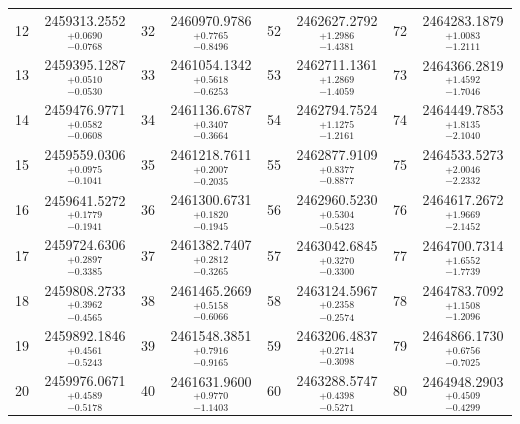 \documentclass[twocolumn,twocolappendix]{aastex631}
\begin{document}
\begin{table}
\begin{tabular}{cc | cc | cc | cc}
12 & 2459313.2552$_{-0.0768}^{+0.0690}$ & 32 & 2460970.9786$_{-0.8496}^{+0.7765}$ & 52 & 2462627.2792$_{-1.4381}^{+1.2986}$ & 72 & 2464283.1879$_{-1.2111}^{+1.0083}$ \\
13 & 2459395.1287$_{-0.0530}^{+0.0510}$ & 33 & 2461054.1342$_{-0.6253}^{+0.5618}$ & 53 & 2462711.1361$_{-1.4059}^{+1.2869}$ & 73 & 2464366.2819$_{-1.7046}^{+1.4592}$ \\
14 & 2459476.9771$_{-0.0608}^{+0.0582}$ & 34 & 2461136.6787$_{-0.3664}^{+0.3407}$ & 54 & 2462794.7524$_{-1.2161}^{+1.1275}$ & 74 & 2464449.7853$_{-2.1040}^{+1.8135}$ \\
15 & 2459559.0306$_{-0.1041}^{+0.0975}$ & 35 & 2461218.7611$_{-0.2035}^{+0.2007}$ & 55 & 2462877.9109$_{-0.8877}^{+0.8377}$ & 75 & 2464533.5273$_{-2.2332}^{+2.0046}$ \\
16 & 2459641.5272$_{-0.1941}^{+0.1779}$ & 36 & 2461300.6731$_{-0.1945}^{+0.1820}$ & 56 & 2462960.5230$_{-0.5423}^{+0.5304}$ & 76 & 2464617.2672$_{-2.1452}^{+1.9669}$ \\
17 & 2459724.6306$_{-0.3385}^{+0.2897}$ & 37 & 2461382.7407$_{-0.3265}^{+0.2812}$ & 57 & 2463042.6845$_{-0.3300}^{+0.3270}$ & 77 & 2464700.7314$_{-1.7739}^{+1.6552}$ \\
18 & 2459808.2733$_{-0.4565}^{+0.3962}$ & 38 & 2461465.2669$_{-0.6066}^{+0.5158}$ & 58 & 2463124.5967$_{-0.2574}^{+0.2358}$ & 78 & 2464783.7092$_{-1.2096}^{+1.1508}$ \\
19 & 2459892.1846$_{-0.5243}^{+0.4561}$ & 39 & 2461548.3851$_{-0.9165}^{+0.7916}$ & 59 & 2463206.4837$_{-0.3098}^{+0.2714}$ & 79 & 2464866.1730$_{-0.7025}^{+0.6756}$ \\
20 & 2459976.0671$_{-0.5178}^{+0.4589}$ & 40 & 2461631.9600$_{-1.1403}^{+0.9770}$ & 60 & 2463288.5747$_{-0.5271}^{+0.4398}$ & 80 & 2464948.2903$_{-0.4299}^{+0.4509}$\\ \hline \hline
\end{tabular}
\end{table}



\end{document}
